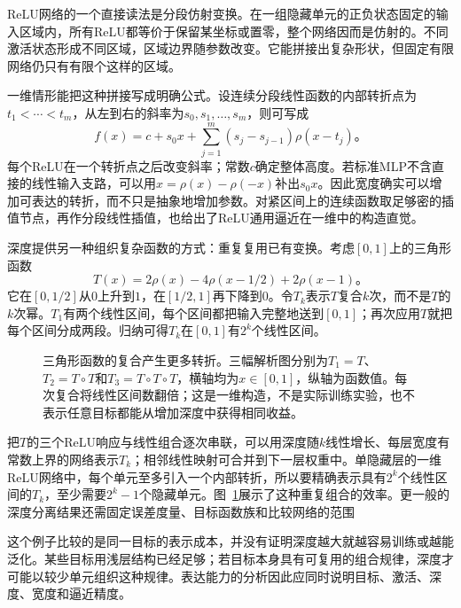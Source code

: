 ReLU网络的一个直接读法是分段仿射变换。在一组隐藏单元的正负状态固定的输入区域内，所有ReLU都等价于保留某坐标或置零，整个网络因而是仿射的。不同激活状态形成不同区域，区域边界随参数改变。它能拼接出复杂形状，但固定有限网络仍只有有限个这样的区域。

一维情形能把这种拼接写成明确公式。设连续分段线性函数的内部转折点为$t_1<\cdots<t_m$，从左到右的斜率为$s_0,s_1,\ldots,s_m$，则可写成
\begin{equation}
  f(x)=c+s_0x+
  \sum_{j=1}^{m}(s_j-s_{j-1})\rho(x-t_j)\text{。}
  \label{eq:ffn-piecewise-linear-representation}
\end{equation}
每个ReLU在一个转折点之后改变斜率；常数$c$确定整体高度。若标准MLP不含直接的线性输入支路，可以用$x=\rho(x)-\rho(-x)$补出$s_0x$。因此宽度确实可以增加可表达的转折，而不只是抽象地增加参数。对紧区间上的连续函数取足够密的插值节点，再作分段线性插值，也给出了ReLU通用逼近在一维中的构造直觉。

深度提供另一种组织复杂函数的方式：重复复用已有变换。考虑$[0,1]$上的三角形函数
\begin{equation}
  T(x)=2\rho(x)-4\rho(x-1/2)+2\rho(x-1)\text{。}
  \label{eq:ffn-tent-function}
\end{equation}
它在$[0,1/2]$从$0$上升到$1$，在$[1/2,1]$再下降到$0$。令$T_k$表示$T$复合$k$次，而不是$T$的$k$次幂。$T_1$有两个线性区间，每个区间都把输入完整地送到$[0,1]$；再次应用$T$就把每个区间分成两段。归纳可得$T_k$在$[0,1]$有$2^k$个线性区间。

\begin{figure}[htb]
  \centering
  
  \caption{三角形函数的复合产生更多转折。三幅解析图分别为$T_1=T$、$T_2=T\circ T$和$T_3=T\circ T\circ T$，横轴均为$x\in[0,1]$，纵轴为函数值。每次复合将线性区间数翻倍；这是一维构造，不是实际训练实验，也不表示任意目标都能从增加深度中获得相同收益。}
  \label{fig:ffn-depth-composition}
\end{figure}

把$T$的三个ReLU响应与线性组合逐次串联，可以用深度随$k$线性增长、每层宽度有常数上界的网络表示$T_k$；相邻线性映射可合并到下一层权重中。单隐藏层的一维ReLU网络中，每个单元至多引入一个内部转折，所以要精确表示具有$2^k$个线性区间的$T_k$，至少需要$2^k-1$个隐藏单元。图~\ref{fig:ffn-depth-composition}展示了这种重复组合的效率。更一般的深度分离结果还需固定误差度量、目标函数族和比较网络的范围

这个例子比较的是同一目标的表示成本，并没有证明深度越大就越容易训练或越能泛化。某些目标用浅层结构已经足够；若目标本身具有可复用的组合规律，深度才可能以较少单元组织这种规律。表达能力的分析因此应同时说明目标、激活、深度、宽度和逼近精度。

